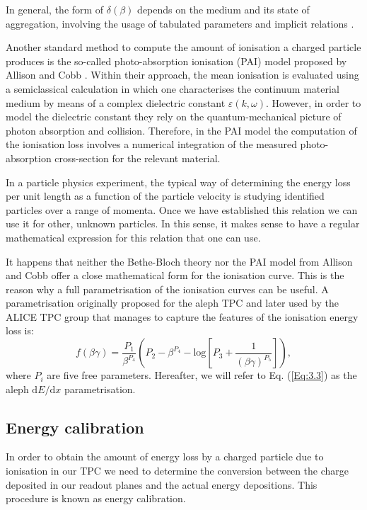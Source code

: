 In general, the form of $\delta(\beta)$ depends on the medium and its state of aggregation, involving the usage of tabulated parameters and implicit relations \cite{Sternheimer1984}.

Another standard method to compute the amount of ionisation a charged particle produces is the so-called photo-absorption ionisation (PAI) model proposed by Allison and Cobb \cite{Allison1980}. Within their approach, the mean ionisation is evaluated using a semiclassical calculation in which one characterises the continuum material medium by means of a complex dielectric constant $\varepsilon(k, \omega)$. However, in order to model the dielectric constant they rely on the quantum-mechanical picture of photon absorption and collision. Therefore, in the PAI model the computation of the ionisation loss involves a numerical integration of the measured photo-absorption cross-section for the relevant material.

In a particle physics experiment, the typical way of determining the energy loss per unit length as a function of the particle velocity is studying identified particles over a range of momenta. Once we have established this relation we can use it for other, unknown particles. In this sense, it makes sense to have a regular mathematical expression for this relation that one can use.

It happens that neither the Bethe-Bloch theory nor the PAI model from Allison and Cobb offer a close mathematical form for the ionisation curve. This is the reason why a full parametrisation of the ionisation curves can be useful. A parametrisation originally proposed for the \gls{aleph} TPC \cite{Blum2008} and later used by the ALICE TPC \cite{ALICETPC2013} group that manages to capture the features of the ionisation energy loss is:
\begin{equation}\label{Eq:3.3}
    f(\beta\gamma) = \frac{P_{1}}{\beta^{P_{4}}}\left(P_{2}-\beta^{P_{4}}-\mathrm{log}\left[P_{3}+\frac{1}{(\beta\gamma)^{P_{5}}}\right]\right),
\end{equation}
where $P_{i}$ are five free parameters. Hereafter, we will refer to Eq. (\ref{Eq:3.3}) as the \gls{aleph} $\mathrm{d}E/\mathrm{d}x$ parametrisation.

\subsection{Energy calibration}

In order to obtain the amount of energy loss by a charged particle due to ionisation in our TPC we need to determine the conversion between the charge deposited in our readout planes and the actual energy depositions. This procedure is known as energy calibration.

